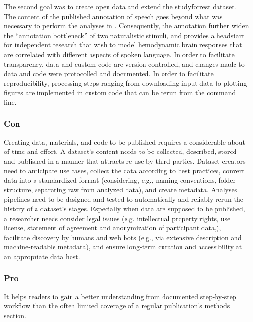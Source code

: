 %
The second goal was to create open data and extend the studyforrest dataset.
The content of the published annotation of speech \citep{haeusler2021speechanno}
goes beyond what was necessary to perform the analyses in
\citet{haeusler2022processing}.
%
Consequently, the annotation further widen the ``annotation bottleneck''
\citep{aliko2020naturalistic} of two naturalistic stimuli, and provides a
headstart for independent research that wish to model hemodynamic brain
responses that are correlated with different aspects of spoken language.
%
In order to facilitate transparency, data and custom code are
version-controlled, and changes made to data and code were protocolled and
documented.
%
In order to facilitate reproducibility, processing steps ranging from
downloading input data to plotting figures are implemented in custom code that
can be rerun from the command line.


\subsubsection{Con}
%
Creating data, materials, and code to be published requires a considerable about
of time and effort.
%
A dataset's content needs to be collected, described, stored and published in a
manner that attracts re-use by third parties.
%
Dataset creators need to anticipate use cases, collect the data according to
best practices, convert data into a standardized format (considering, e.g.,
naming conventions, folder structure, separating raw from analyzed data), and
create metadata.
%
Analyses pipelines need to be designed and tested to automatically and
reliably rerun the history of a dataset's stages.
%
Especially when data are supposed to be published, a researcher needs consider
legal issues (e.g. intellectual property rights, use license, statement of
agreement and anonymization of participant data,), facilitate discovery by
humans and web bots (e.g., via extensive description and machine-readable
metadata), and ensure long-term curation and accessibility at an appropriate
data host.



\subsubsection{Pro}


It helps readers to gain a better understanding from documented step-by-step
workflow than the often limited coverage of a regular publication's methods
section.



